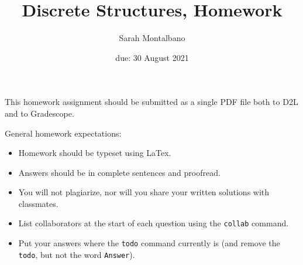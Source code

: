 \documentclass{article}
\title{Discrete Structures, Homework \hwnum}
\author{Sarah Montalbano}}
\date{due: 30 August 2021}
\begin{document}
\maketitle

This homework assignment should be
submitted as a single PDF file both to D2L and to Gradescope.

General homework expectations:
\begin{itemize}
    \item Homework should be typeset using LaTex.
    \item Answers should be in complete sentences and proofread.
    \item You will not plagiarize, nor will you share your written solutions
        with classmates.
    \item List collaborators at the start of each question using the
        \texttt{collab} command.
    \item Put your answers where the \texttt{todo} command currently is (and
        remove the \texttt{todo}, but not the word \texttt{Answer}).
\end{itemize}

\end{document}

